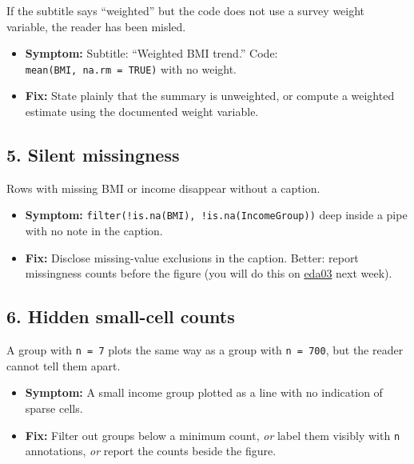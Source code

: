 \documentclass[
  letterpaper,
  DIV=11,
  numbers=noendperiod,
  oneside]{scrreprt}
\providecommand{\tightlist}{%
  \setlength{\itemsep}{0pt}\setlength{\parskip}{0pt}}
\begin{document}
If the subtitle says ``weighted'' but the code does not use a survey
weight variable, the reader has been misled.

\begin{itemize}
\tightlist
\item
  \textbf{Symptom:} Subtitle: ``Weighted BMI trend.'' Code:
  \texttt{mean(BMI,\ na.rm\ =\ TRUE)} with no weight.
\item
  \textbf{Fix:} State plainly that the summary is unweighted, or compute
  a weighted estimate using the documented weight variable.
\end{itemize}

\subsection*{5. Silent missingness}\label{silent-missingness}

Rows with missing BMI or income disappear without a caption.

\begin{itemize}
\tightlist
\item
  \textbf{Symptom:} \texttt{filter(!is.na(BMI),\ !is.na(IncomeGroup))}
  deep inside a pipe with no note in the caption.
\item
  \textbf{Fix:} Disclose missing-value exclusions in the caption.
  Better: report missingness counts before the figure (you will do this
  on \href{../week07-eda-ai-audit/eda03-worked-example.qmd}{eda03} next
  week).
\end{itemize}

\subsection*{6. Hidden small-cell
counts}\label{hidden-small-cell-counts}

A group with \texttt{n\ =\ 7} plots the same way as a group with
\texttt{n\ =\ 700}, but the reader cannot tell them apart.

\begin{itemize}
\tightlist
\item
  \textbf{Symptom:} A small income group plotted as a line with no
  indication of sparse cells.
\item
  \textbf{Fix:} Filter out groups below a minimum count, \emph{or} label
  them visibly with \texttt{n} annotations, \emph{or} report the counts
  beside the figure.
\end{itemize}
\end{document}
